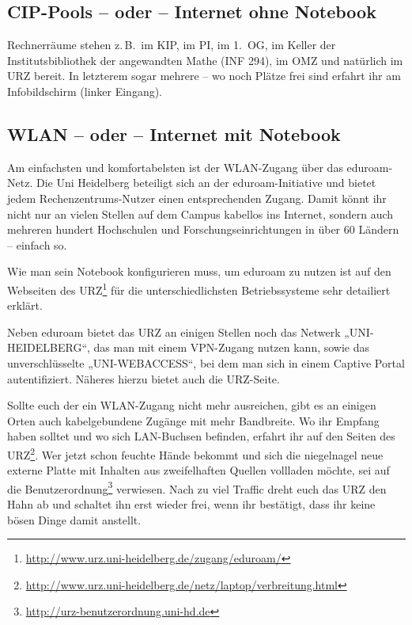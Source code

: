 \subsection*{CIP-Pools -- oder -- Internet ohne Notebook}
Rechnerräume stehen z.\,B.\ im \gls{KIP}, im \gls{PI}, im 1.~OG, im Keller der Institutsbibliothek der angewandten Mathe (\Gls{INF} 294), im \Gls{OMZ} und natürlich im \gls{URZ} bereit. In letzterem sogar mehrere -- wo noch Plätze frei sind erfahrt ihr am Infobildschirm (linker Eingang).

\subsection*{WLAN -- oder -- Internet mit Notebook}
Am einfachsten und komfortabelsten ist der WLAN-Zugang über das eduroam-Netz.
Die Uni Heidelberg beteiligt sich an der eduroam-Initiative und bietet jedem Rechenzentrums-Nutzer einen entsprechenden Zugang. Damit könnt ihr nicht nur an vielen Stellen auf dem Campus kabellos ins Internet, sondern auch mehreren hundert Hochschulen und Forschungseinrichtungen in über 60 Ländern – einfach so.

Wie man sein Notebook konfigurieren muss, um eduroam zu nutzen ist auf den Webseiten des URZ\footnote{\url{http://www.urz.uni-heidelberg.de/zugang/eduroam/}} für die unterschiedlichsten Betriebssysteme sehr detailiert erklärt.

Neben eduroam bietet das URZ an einigen Stellen noch das Netwerk „UNI-HEIDELBERG“, das man mit einem VPN-Zugang nutzen kann, sowie das unverschlüsselte „UNI-WEBACCESS“, bei dem man sich in einem Captive Portal autentifiziert. Näheres hierzu bietet auch die URZ-Seite.%

Sollte euch der ein WLAN-Zugang nicht mehr ausreichen, gibt es an einigen Orten auch kabelgebundene Zugänge mit mehr Bandbreite. Wo ihr Empfang haben solltet und wo sich LAN-Buchsen befinden, erfahrt ihr auf den Seiten des \gls{URZ}\footnote{\url{http://www.urz.uni-heidelberg.de/netz/laptop/verbreitung.html}}. Wer jetzt schon feuchte Hände bekommt und sich die niegelnagel neue externe Platte mit Inhalten aus zweifelhaften Quellen vollladen möchte, sei auf die Benutzerordnung\footnote{\url{http://urz-benutzerordnung.uni-hd.de}} verwiesen. Nach zu viel Traffic dreht euch das \gls{URZ} den Hahn ab und schaltet ihn erst wieder frei, wenn ihr bestätigt, dass ihr keine bösen Dinge damit anstellt.

